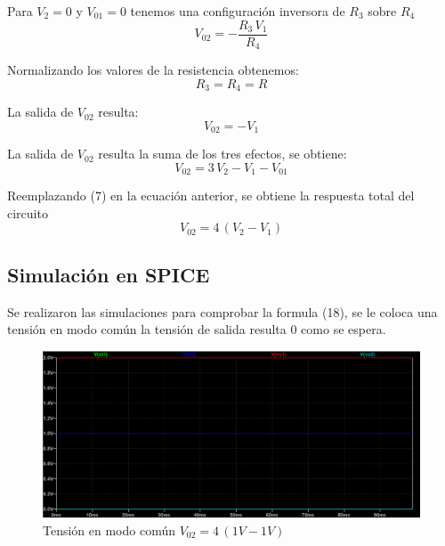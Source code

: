 \documentclass[12pt]{article}
\begin{document}
		Para $V_2=0$ y $V_{01}=0$  tenemos una configuración inversora de $R_3$ sobre $R_4$
		\begin{equation}
			V_{02}=-\frac{R_3 \,V_1 }{R_4 }
		\end{equation}
		
		Normalizando los valores de la resistencia obtenemos:
		\begin{equation}
			R_3=R_4=R 
		\end{equation}
		
		La salida de $V_{02}$ resulta:
		\begin{equation}
			V_{02}=-V_1
		\end{equation}
		
		La salida de $V_{02}$ resulta la suma de los tres efectos, se obtiene:
		\begin{equation}
			V_{02}=3\,V_2-V_1-V_{01}
		\end{equation}
		
		Reemplazando (7) en la ecuación anterior, se obtiene la respuesta total del circuito
		\begin{equation}
			V_{02}=4\,(V_2-V_1)
		\end{equation}
		
		\subsection{Simulación en SPICE}
		Se realizaron las simulaciones para comprobar la formula (18), se le coloca una tensión en modo común
		la tensión de salida resulta 0 como se espera.
		
		\begin{figure}[h]
			\centering
			\includegraphics[width=1\linewidth]{Simulaciones-Resultados/Circuito1_Vo1(Vc)-Vo2(Vc)}
			\caption{Tensión en modo común $V_{02}=4\,(1V-1V)$}
			\label{fig:circuito1vo1vc-vo2vc}
		\end{figure} \newpage
		
\end{document}
